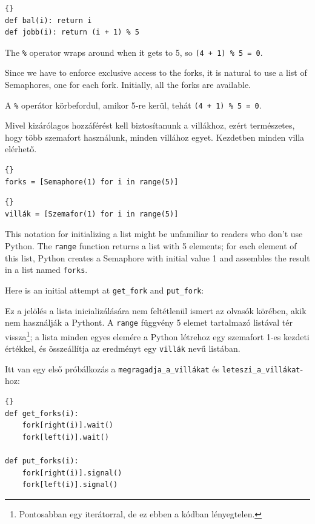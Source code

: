 \documentclass{book}
\begin{document}
\begin{lstlisting}[title={Melyik villa?}]{}
def bal(i): return i
def jobb(i): return (i + 1) % 5
\end{lstlisting}

The {\tt \%} operator wraps around when it gets to 5, so
{\tt (4 + 1) \% 5 = 0}.

Since we have to enforce exclusive access to the forks,
it is natural to use a list of Semaphores, one for
each fork.  Initially, all the forks are available.

A {\tt \%} operátor körbefordul, amikor 5-re kerül, tehát {\tt (4 + 1) \% 5 = 0}.

Mivel kizárólagos hozzáférést kell biztosítanunk a villákhoz, ezért
természetes, hogy több szemafort használunk, minden villához egyet.
Kezdetben minden villa elérhető.

\begin{lstlisting}[title={Variables for dining philosophers}]{}
forks = [Semaphore(1) for i in range(5)]
\end{lstlisting}

\begin{lstlisting}[title={Változók a vacsorázó filozófusoknak}]{}
villák = [Szemafor(1) for i in range(5)]
\end{lstlisting}

This notation for initializing a list might be unfamiliar to
readers who don't use Python.  The {\tt range} function returns
a list with 5 elements; for each element of this list, Python
creates a Semaphore with initial value 1 and assembles the
result in a list named {\tt forks}.

Here is an initial attempt at {\tt get\_fork} and {\tt put\_fork}:

Ez a jelölés a lista inicializálására nem feltétlenül ismert az olvasók
körében, akik nem használják a Pythont. A {\tt range} függvény 5 elemet tartalmazó
listával tér vissza\footnote{Pontosabban egy iterátorral, de ez ebben a kódban lényegtelen.};
a lista minden egyes elemére a Python létrehoz egy
szemafort 1-es kezdeti értékkel, és összeállítja az eredményt egy {\tt villák}
nevű listában.

Itt van egy első próbálkozás a {\tt megragadja\_a\_villákat} és {\tt leteszi\_a\_villákat}-hoz:

\begin{lstlisting}[title={Dining philosophers non-solution}]{}
def get_forks(i):
    fork[right(i)].wait()
    fork[left(i)].wait()

def put_forks(i):
    fork[right(i)].signal()
    fork[left(i)].signal()
\end{lstlisting}
\end{document}
